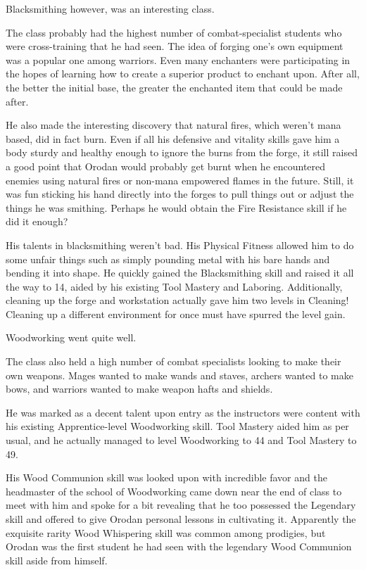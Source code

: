 \documentclass[a4paper,10pt]{book}
\begin{document}
Blacksmithing however, was an interesting class.\par
The class probably had the highest number of combat-specialist students who were cross-training that he had seen. The idea of forging one’s own equipment was a popular one among warriors. Even many enchanters were participating in the hopes of learning how to create a superior product to enchant upon. After all, the better the initial base, the greater the enchanted item that could be made after.\par
He also made the interesting discovery that natural fires, which weren’t mana based, did in fact burn. Even if all his defensive and vitality skills gave him a body sturdy and healthy enough to ignore the burns from the forge, it still raised a good point that Orodan would probably get burnt when he encountered enemies using natural fires or non-mana empowered flames in the future. Still, it was fun sticking his hand directly into the forges to pull things out or adjust the things he was smithing. Perhaps he would obtain the Fire Resistance skill if he did it enough?\par
His talents in blacksmithing weren’t bad. His Physical Fitness allowed him to do some unfair things such as simply pounding metal with his bare hands and bending it into shape. He quickly gained the Blacksmithing skill and raised it all the way to 14, aided by his existing Tool Mastery and Laboring. Additionally, cleaning up the forge and workstation actually gave him two levels in Cleaning! Cleaning up a different environment for once must have spurred the level gain.\par
Woodworking went quite well.\par
The class also held a high number of combat specialists looking to make their own weapons. Mages wanted to make wands and staves, archers wanted to make bows, and warriors wanted to make weapon hafts and shields.\par
He was marked as a decent talent upon entry as the instructors were content with his existing Apprentice-level Woodworking skill. Tool Mastery aided him as per usual, and he actually managed to level Woodworking to 44 and Tool Mastery to 49.\par
His Wood Communion skill was looked upon with incredible favor and the headmaster of the school of Woodworking came down near the end of class to meet with him and spoke for a bit revealing that he too possessed the Legendary skill and offered to give Orodan personal lessons in cultivating it. Apparently the exquisite rarity Wood Whispering skill was common among prodigies, but Orodan was the first student he had seen with the legendary Wood Communion skill aside from himself.\par
\end{document}

